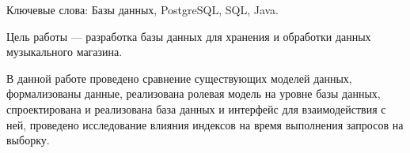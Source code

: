 
\begin{essay}{1}
	
Ключевые слова: Базы данных, PostgreSQL, SQL, Java.

Цель работы --- разработка базы данных для хранения и обработки данных музыкального магазина.

В данной работе проведено сравнение существующих моделей данных, формализованы данные, реализована ролевая модель на уровне базы данных, спроектирована и реализована база данных и интерфейс для взаимодействия с ней, проведено исследование влияния индексов на время выполнения запросов на выборку.

\end{essay}